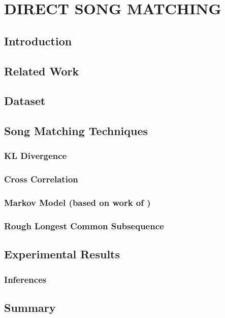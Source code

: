 \chapter{DIRECT SONG MATCHING}
 \label{chap:songMatch}
 \section{Introduction}


\section{Related Work}
 \label{sec:rwSongMatch}
 

\section{Dataset}
\label{sec:dataSongMatch}


\section{Song Matching Techniques}
\label{sec:smt}

\subsection{KL Divergence} 


\subsection{Cross Correlation}

\subsection{Markov Model (based on work of \cite{shilf})}


\subsection{Rough Longest Common Subsequence}


\section{Experimental Results}

\subsection{Inferences}

\section{Summary}
